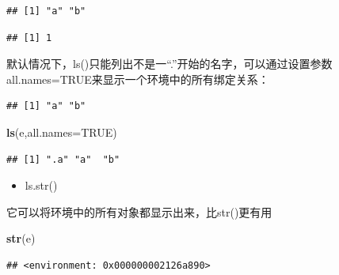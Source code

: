 \documentclass[]{book}
\newenvironment{Shaded}{\begin{snugshade}}{\end{snugshade}}
\newcommand{\KeywordTok}[1]{\textcolor[rgb]{0.13,0.29,0.53}{\textbf{#1}}}
\newcommand{\DataTypeTok}[1]{\textcolor[rgb]{0.13,0.29,0.53}{#1}}
\newcommand{\DecValTok}[1]{\textcolor[rgb]{0.00,0.00,0.81}{#1}}
\newcommand{\StringTok}[1]{\textcolor[rgb]{0.31,0.60,0.02}{#1}}
\newcommand{\OtherTok}[1]{\textcolor[rgb]{0.56,0.35,0.01}{#1}}
\newcommand{\OperatorTok}[1]{\textcolor[rgb]{0.81,0.36,0.00}{\textbf{#1}}}
\newcommand{\NormalTok}[1]{#1}
\providecommand{\tightlist}{%
  \setlength{\itemsep}{0pt}\setlength{\parskip}{0pt}}
\begin{document}
\begin{verbatim}
## [1] "a" "b"
\end{verbatim}

\begin{Shaded}
\end{Shaded}

\begin{verbatim}
## [1] 1
\end{verbatim}

默认情况下，ls()只能列出不是一``.''开始的名字，可以通过设置参数all.names=TRUE来显示一个环境中的所有绑定关系：

\begin{Shaded}
\end{Shaded}

\begin{verbatim}
## [1] "a" "b"
\end{verbatim}

\begin{Shaded}
\begin{Highlighting}[]
\KeywordTok{ls}\NormalTok{(e,}\DataTypeTok{all.names=}\OtherTok{TRUE}\NormalTok{)}
\end{Highlighting}
\end{Shaded}

\begin{verbatim}
## [1] ".a" "a"  "b"
\end{verbatim}

\begin{itemize}
\tightlist
\item
  ls.str()
\end{itemize}

它可以将环境中的所有对象都显示出来，比str()更有用

\begin{Shaded}
\begin{Highlighting}[]
\KeywordTok{str}\NormalTok{(e)}
\end{Highlighting}
\end{Shaded}

\begin{verbatim}
## <environment: 0x000000002126a890>
\end{verbatim}
\end{document}
